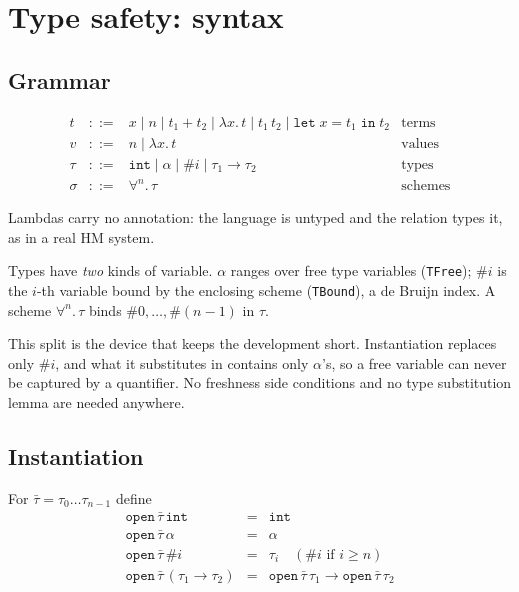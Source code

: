 \documentclass[11pt,a4paper]{article}
\newcommand{\tint}{\mathtt{int}}
\begin{document}
\section{Type safety: syntax}
\label{sec:safe-syntax}

\subsection{Grammar}

\[
\begin{array}{lcll}
  t & ::= & x \mid n \mid t_1 + t_2 \mid \lambda x.\,t \mid t_1\,t_2
            \mid \mathtt{let}\;x = t_1\;\mathtt{in}\;t_2
    & \text{terms}\\[2pt]
  v & ::= & n \mid \lambda x.\,t
    & \text{values}\\[2pt]
  \tau & ::= & \tint \mid \alpha \mid \#i \mid \tau_1 \to \tau_2
    & \text{types}\\[2pt]
  \sigma & ::= & \forall^{n}.\,\tau
    & \text{schemes}
\end{array}
\]

Lambdas carry no annotation: the language is untyped and the relation types it,
as in a real HM system.

Types have \emph{two} kinds of variable.  $\alpha$ ranges over free type
variables (\texttt{TFree}); $\#i$ is the $i$-th variable bound by the
enclosing scheme (\texttt{TBound}), a de Bruijn index.  A scheme
$\forall^{n}.\,\tau$ binds $\#0,\dots,\#(n-1)$ in $\tau$.

This split is the device that keeps the development short.  Instantiation
replaces only $\#i$, and what it substitutes in contains only $\alpha$'s, so a
free variable can never be captured by a quantifier.  No freshness side
conditions and no type substitution lemma are needed anywhere.

\subsection{Instantiation}

For $\bar\tau = \tau_0 \dots \tau_{n-1}$ define
\[
\begin{array}{lcl}
  \mathtt{open}\,\bar\tau\,\tint &=& \tint \\
  \mathtt{open}\,\bar\tau\,\alpha &=& \alpha \\
  \mathtt{open}\,\bar\tau\,\#i &=& \tau_i \quad (\text{$\#i$ if } i \geq n) \\
  \mathtt{open}\,\bar\tau\,(\tau_1 \to \tau_2) &=&
    \mathtt{open}\,\bar\tau\,\tau_1 \to \mathtt{open}\,\bar\tau\,\tau_2
\end{array}
\]
\end{document}
